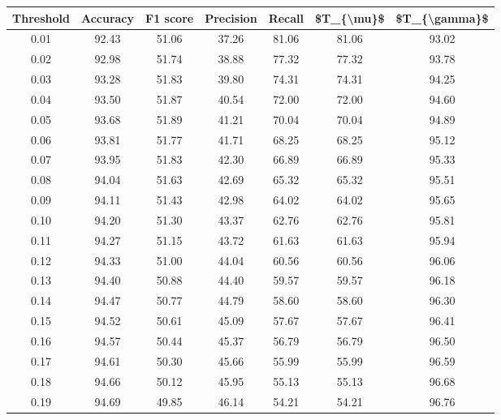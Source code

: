 \begin{tabular}{|c|c|c|c|c|c|c|}
\hline
 Threshold &  Accuracy &  F1 score &  Precision &  Recall &  \$T\_\{\textbackslash mu\}\$ &  \$T\_\{\textbackslash gamma\}\$ \\
\hline
      0.01 &     92.43 &     51.06 &      37.26 &   81.06 &      81.06 &         93.02 \\
      0.02 &     92.98 &     51.74 &      38.88 &   77.32 &      77.32 &         93.78 \\
      0.03 &     93.28 &     51.83 &      39.80 &   74.31 &      74.31 &         94.25 \\
      0.04 &     93.50 &     51.87 &      40.54 &   72.00 &      72.00 &         94.60 \\
      0.05 &     93.68 &     51.89 &      41.21 &   70.04 &      70.04 &         94.89 \\
      0.06 &     93.81 &     51.77 &      41.71 &   68.25 &      68.25 &         95.12 \\
      0.07 &     93.95 &     51.83 &      42.30 &   66.89 &      66.89 &         95.33 \\
      0.08 &     94.04 &     51.63 &      42.69 &   65.32 &      65.32 &         95.51 \\
      0.09 &     94.11 &     51.43 &      42.98 &   64.02 &      64.02 &         95.65 \\
      0.10 &     94.20 &     51.30 &      43.37 &   62.76 &      62.76 &         95.81 \\
      0.11 &     94.27 &     51.15 &      43.72 &   61.63 &      61.63 &         95.94 \\
      0.12 &     94.33 &     51.00 &      44.04 &   60.56 &      60.56 &         96.06 \\
      0.13 &     94.40 &     50.88 &      44.40 &   59.57 &      59.57 &         96.18 \\
      0.14 &     94.47 &     50.77 &      44.79 &   58.60 &      58.60 &         96.30 \\
      0.15 &     94.52 &     50.61 &      45.09 &   57.67 &      57.67 &         96.41 \\
      0.16 &     94.57 &     50.44 &      45.37 &   56.79 &      56.79 &         96.50 \\
      0.17 &     94.61 &     50.30 &      45.66 &   55.99 &      55.99 &         96.59 \\
      0.18 &     94.66 &     50.12 &      45.95 &   55.13 &      55.13 &         96.68 \\
      0.19 &     94.69 &     49.85 &      46.14 &   54.21 &      54.21 &         96.76 \\

\end{tabular}
